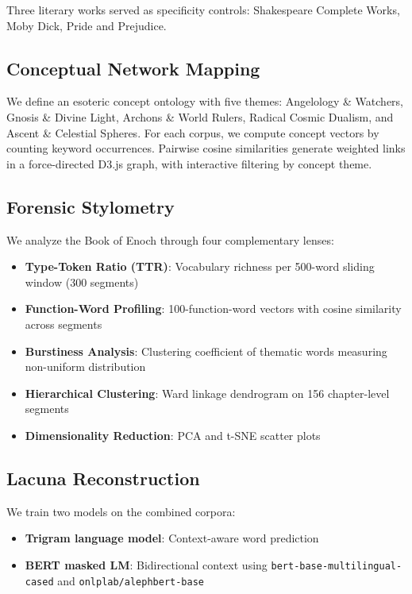 \documentclass[11pt]{article}
\begin{document}
Three literary works served as specificity controls: Shakespeare Complete Works, Moby Dick, Pride and Prejudice.

\subsection{Conceptual Network Mapping}

We define an esoteric concept ontology with five themes: Angelology \& Watchers, Gnosis \& Divine Light, Archons \& World Rulers, Radical Cosmic Dualism, and Ascent \& Celestial Spheres. For each corpus, we compute concept vectors by counting keyword occurrences. Pairwise cosine similarities generate weighted links in a force-directed D3.js graph, with interactive filtering by concept theme.

\subsection{Forensic Stylometry}

We analyze the Book of Enoch through four complementary lenses:

\begin{itemize}
    \item \textbf{Type-Token Ratio (TTR)}: Vocabulary richness per 500-word sliding window (300 segments)
    \item \textbf{Function-Word Profiling}: 100-function-word vectors with cosine similarity across segments
    \item \textbf{Burstiness Analysis}: Clustering coefficient of thematic words measuring non-uniform distribution
    \item \textbf{Hierarchical Clustering}: Ward linkage dendrogram on 156 chapter-level segments
    \item \textbf{Dimensionality Reduction}: PCA and t-SNE scatter plots
\end{itemize}

\subsection{Lacuna Reconstruction}

We train two models on the combined corpora:

\begin{itemize}
    \item \textbf{Trigram language model}: Context-aware word prediction
    \item \textbf{BERT masked LM}: Bidirectional context using \texttt{bert-base-multilingual-cased} and \texttt{onlplab/alephbert-base}
\end{itemize}
\end{document}
